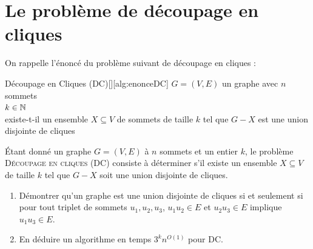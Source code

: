 \section{Le problème de découpage en cliques}\label{sec:dm1-fpt}

On rappelle l'énoncé du problème suivant de découpage en cliques : 

\begin{cleanalgoenonce}{Découpage en Cliques (DC)}[][alg:enonceDC]
     \(G = (V, E)\) un graphe avec \(n\) sommets \\
     \(k\in\mathbb{N}\)\\
     existe-t-il un ensemble \(X \subseteq V\) de sommets de taille \(k\) tel que \(G - X\) est une union disjointe de cliques

\end{cleanalgoenonce}

\begin{td-exo}
    Étant donn\'e un graphe \(G=(V,E)\) \`a \(n\) sommets et un entier \(k\), le probl\`eme \textsc{Découpage en cliques} (\textsc{DC}) consiste \`a d\'eterminer s'il existe un ensemble \(X \subseteq V\) de taille \(k\) tel que \(G - X\) soit une union disjointe de cliques.
    \begin{enumerate}[label=\alph*)]
        \item\label{q1} Démontrer qu'un graphe est une union disjointe de cliques si et seulement si pour tout triplet de sommets \(u_1, u_2, u_3\), \(u_1 u_2 \in E\) et \(u_2 u_3 \in E\) implique \(u_1 u_3 \in E\).
        \item En déduire un algorithme en temps \(3^k n^{O(1)}\) pour \textsc{DC}.
    \end{enumerate}
\end{td-exo}

